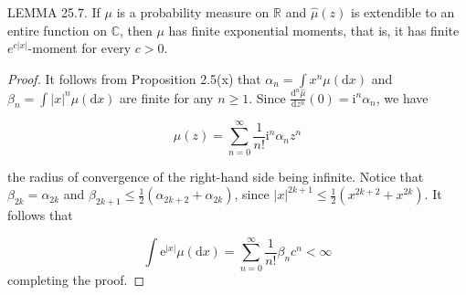 \documentclass[a4paper,11pt]{article}
\begin{document}
LEMMA 25.7. If $\mu$ is a probability measure on $\mathbb{R}$ and $\widehat{\mu}(z)$ is extendible to an entire
function on $\mathbb{C}$, then $\mu$ has finite exponential moments, that is, it has finite $e^{c|x|}$-moment for every $c>0$.

\begin{proof}
    It follows from Proposition 2.5(x) that $\alpha_{n}=\int x^{n} \mu(\mathrm{d} x)$ and
    $\beta_{n}=\int|x|^{n} \mu(\mathrm{d} x)$ are finite for any $n \geq 1$. Since
    $\frac{\mathrm{d}^{n} \widehat{\mu}}{\mathrm{d} z^{n}}(0)=\mathrm{i}^{n} \alpha_{n}$, we have

    $$
        \widehat{\mu}(z)=\sum_{n=0}^{\infty} \frac{1}{n !} \mathrm{i}^{n} \alpha_{n} z^{n}
    $$

    the radius of convergence of the right-hand side being infinite. Notice that $\beta_{2 k}=\alpha_{2 k}$ and
    $\beta_{2 k+1} \leq \frac{1}{2}\left(\alpha_{2 k+2}+\alpha_{2 k}\right)$, since
    $|x|^{2 k+1} \leq \frac{1}{2}\left(x^{2 k+2}+x^{2 k}\right)$. It follows that

    $$
        \int \mathrm{e}^{|x|} \mu(\mathrm{d} x)=\sum_{n=0}^{\infty} \frac{1}{n !} \beta_{n} c^{n}<\infty
    $$
    completing the proof.

\end{proof}
\end{document}

